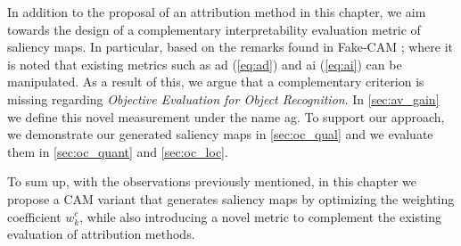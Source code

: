 \noindent In addition to the proposal of an attribution method in this chapter, we aim towards the 
design of a complementary interpretability evaluation metric of saliency maps. In particular, 
based on the remarks found in Fake-CAM \autocite{poppi2021revisiting}; where it is noted that 
existing metrics such as \gls{ad} (\ref{eq:ad}) and \gls{ai} (\ref{eq:ai}) can be manipulated. As a 
result of this, we argue that a complementary criterion is missing regarding \textit{Objective 
Evaluation for Object Recognition}. In \autoref{sec:av_gain} we define this novel measurement 
under the name \gls{ag}. To support our approach, we demonstrate our generated saliency maps in 
\autoref{sec:oc_qual} and we evaluate them in \autoref{sec:oc_quant} and \autoref{sec:oc_loc}.

\noindent To sum up, with the observations previously mentioned, in this chapter we propose a CAM 
variant that generates saliency maps by optimizing the weighting coefficient $w_k^c$, while also 
introducing a novel metric to complement the existing evaluation of attribution methods.\\










